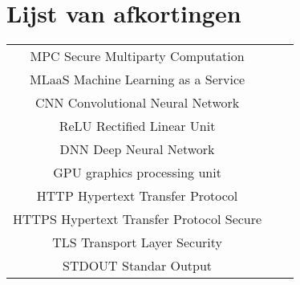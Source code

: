 \chapter*{Lijst van afkortingen}
\begin{table}[!h]
	\begin{tabular}{cll}
		MPC				Secure Multiparty Computation\\
		MLaaS			Machine Learning as a Service\\
		CNN				Convolutional Neural Network\\
		ReLU			Rectified Linear Unit\\
		DNN 			Deep Neural Network\\
		GPU 			graphics processing unit\\
		HTTP			Hypertext Transfer Protocol\\
		HTTPS			Hypertext Transfer Protocol Secure\\
		TLS				Transport Layer Security\\
		STDOUT		Standar Output\\
	\end{tabular}
\end{table}
